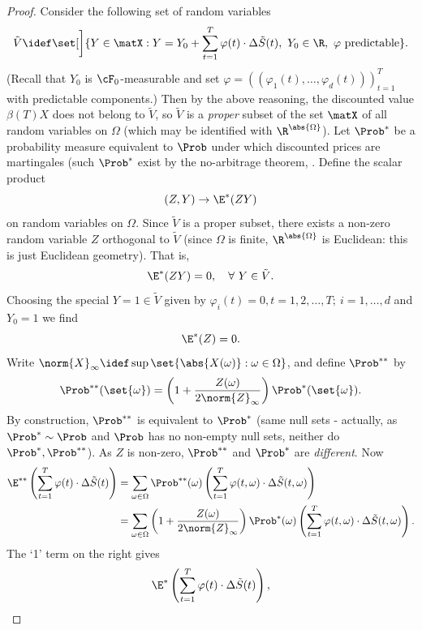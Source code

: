 \begin{proof}
	Consider the following set of random variables
	\[
		\tilde{V} \idef \set[\bigg]{Y \in \matX : Y = Y_0 + \sum_{t=1}^T \varphi(t) \cdot \Delta \tilde{S}(t), \ Y_0 \in \R, \ \varphi \text{ predictable}}.
	\]
	(Recall that \(Y_0\) is \(\cF_0\)-measurable and set \(\varphi = ((\varphi_1(t), \dots, \varphi_d(t)))_{t=1}^T\) with predictable components.) Then by the above reasoning, the discounted value \(\beta(T)X\) does not belong to \(\tilde{V}\), so \(\tilde{V}\) is a \textit{proper} subset of the set \(\matX\) of all random variables on \(\Omega\) (which may be identified with \(\R^{\abs{\Omega}}\)). Let \(\Prob^*\) be a probability measure equivalent to \(\Prob\) under which discounted prices are martingales (such \(\Prob^*\) exist by the no-arbitrage theorem, . Define the scalar product
	\[
		(Z, Y) \to \E^*(ZY)
	\]
	on random variables on \(\Omega\). Since \(\tilde{V}\) is a proper subset, there exists a non-zero random variable \(Z\) orthogonal to \(\tilde{V}\) (since \(\Omega\) is finite, \(\R^{\abs{\Omega}}\) is Euclidean: this is just Euclidean geometry). That is,
	\[
		\E^*(ZY) = 0, \quad \forall \ Y \in \tilde{V}.
	\]
	Choosing the special \(Y = 1 \in \tilde{V}\) given by \(\varphi_i(t) = 0, t = 1, 2, \dots, T; \ i = 1, \dots, d\) and \(Y_0 = 1\) we find
	\[
		\E^*(Z) = 0.
	\]
	Write \(\norm{X}_\infty \idef \sup\set{\abs{X(\omega)} : \omega \in \Omega}\), and define \(\Prob^{**}\) by
	\[
		\Prob^{**}(\set{\omega}) = \left( 1 + \frac{Z(\omega)}{2\norm{Z}_\infty} \right) \Prob^*(\set{\omega}).
	\]
	By construction, \(\Prob^{**}\) is equivalent to \(\Prob^*\) (same null sets - actually, as \(\Prob^* \sim \Prob\) and \(\Prob\) has no non-empty null sets, neither do \(\Prob^*, \Prob^{**}\)). As \(Z\) is non-zero, \(\Prob^{**}\) and \(\Prob^*\) are \textit{different}. Now
	\begin{align*}
		\E^{**} \left( \sum_{t=1}^T \varphi(t) \cdot \Delta \tilde{S}(t) \right) & = \sum_{\omega \in \Omega} \Prob^{**}(\omega) \left( \sum_{t=1}^T \varphi(t, \omega) \cdot \Delta \tilde{S}(t, \omega) \right)                                                     \\
		                                                                         & = \sum_{\omega \in \Omega} \left( 1 + \frac{Z(\omega)}{2\norm{Z}_\infty} \right) \Prob^*(\omega) \left( \sum_{t=1}^T \varphi(t, \omega) \cdot \Delta \tilde{S}(t, \omega) \right).
	\end{align*}
	The `1' term on the right gives
	\[
		\E^* \left( \sum_{t=1}^T \varphi(t) \cdot \Delta \tilde{S}(t) \right),
\]
\end{proof}
